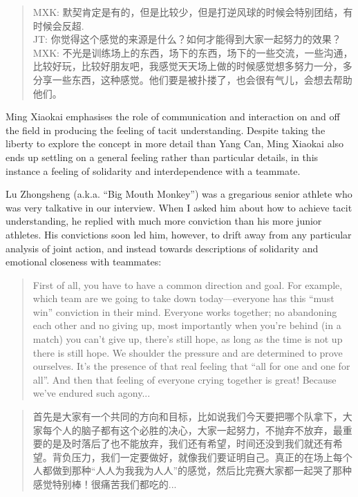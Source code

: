 \begin{CJK}{UTF8}{gbsn}
    \begin{quotation}
        MXK: 默契肯定是有的，但是比较少，但是打逆风球的时候会特别团结，有时候会反超. \\
        JT: 你觉得这个感觉的来源是什么？如何才能得到大家一起努力的效果？ \\
        MXK: 不光是训练场上的东西，场下的东西，场下的一些交流，一些沟通，比较好玩，比较好朋友吧，我感觉天天场上做的时候感觉想多努力一分，多分享一些东西，这种感觉。他们要是被扑搂了，也会很有气儿，会想去帮助他们。 
    \end{quotation}

Ming Xiaokai emphasises the role of communication and interaction on and off the field in producing the feeling of tacit understanding.  Despite taking the liberty to explore the concept in more detail than Yang Can, Ming Xiaokai also ends up settling on a general feeling rather than particular details, in this instance a feeling of solidarity and interdependence with a teammate.

Lu Zhongsheng (a.k.a. ``Big Mouth Monkey'') was a gregarious senior athlete who was very talkative in our interview.  When I asked him about how to achieve tacit understanding, he replied with much more conviction than his more junior athletes.  His convictions soon led him, however, to drift away from any particular analysis of joint action, and instead towards descriptions of solidarity and emotional closeness with teammates:

    \begin{quotation}
      First of all, you have to have a common direction and goal.  For example, which team are we going to take down today---everyone has this ``must win'' conviction in their mind.  Everyone works together; no abandoning each other and no giving up, most importantly when you’re behind (in a match) you can’t give up, there’s still hope, as long as the time is not up there is still hope.  We shoulder the pressure and are determined to prove ourselves.  It's the presence of that real feeling that ``all for one and one for all''.  And then that feeling of everyone crying together is great! Because we've endured such agony...
    \end{quotation}

    \begin{quotation}
      首先是大家有一个共同的方向和目标，比如说我们今天要把哪个队拿下，大家每个人的脑子都有这个必胜的决心，大家一起努力，不抛弃不放弃，最重要的是及时落后了也不能放弃，我们还有希望，时间还没到我们就还有希望。背负压力，我们一定要做好，就像我们要证明自己。真正的在场上每个人都做到那种“人人为我我为人人”的感觉，然后比完赛大家都一起哭了那种感觉特别棒！很痛苦我们都吃的...
    \end{quotation}



\end{CJK}
